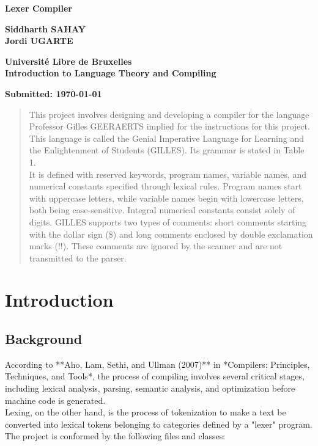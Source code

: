 \documentclass[12pt,a4paper]{report}
\begin{document}
	
	\begin{titlepage}
		\centering
		\vspace*{2cm}
		
		\Huge
		\textbf{Lexer Compiler}
		
		\vspace{1.5cm}
		
		\Large
		\textbf{Siddharth SAHAY} \\
		\textbf{Jordi UGARTE}		
		
		\vfill
		
		\Large
		\textbf{Université Libre de Bruxelles} \\
		\textbf{Introduction to Language Theory and Compiling}
		
		\vspace{0.8cm}
		
		\large
		\textbf{Submitted: \today}
		
		\vfill
	\end{titlepage}
	
	\begin{abstract}
		This project involves designing and developing a compiler for the language Professor Gilles GEERAERTS implied for the instructions for this project. This language is called the Genial Imperative Language for Learning and the Enlightenment of Students (GILLES). Its grammar is stated in Table 1.\\ It is defined with reserved keywords, program names, variable names, and numerical constants specified through lexical rules. Program names start with uppercase letters, while variable names begin with lowercase letters, both being case-sensitive. Integral numerical constants consist solely of digits. GILLES supports two types of comments: short comments starting with the dollar sign (\$) and long comments enclosed by double exclamation marks (!!). These comments are ignored by the scanner and are not transmitted to the parser.
	\end{abstract}


	\tableofcontents
	\newpage
	
	
	\chapter{Introduction}
	\section{Background}
	According to **Aho, Lam, Sethi, and Ullman (2007)** in *Compilers: Principles, Techniques, and Tools*, the process of compiling involves several critical stages, including lexical analysis, parsing, semantic analysis, and optimization before machine code is generated. \\
	Lexing, on the other hand, is the process of tokenization to make a text be converted into lexical tokens belonging to categories defined by a "lexer" program. \\
	The project is conformed by the following files and classes:\\
\end{document}

